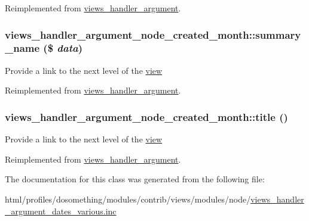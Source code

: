 Reimplemented from \hyperlink{classviews__handler__argument_aad03acefdb44288d7e6c7793bc33f66c}{views\_\-handler\_\-argument}.\hypertarget{classviews__handler__argument__node__created__month_a1376f79ca0408659bea06caa51ce6da6}{
\subsubsection[{summary\_\-name}]{\setlength{\rightskip}{0pt plus 5cm}views\_\-handler\_\-argument\_\-node\_\-created\_\-month::summary\_\-name (\$ {\em data})}}
\label{classviews__handler__argument__node__created__month_a1376f79ca0408659bea06caa51ce6da6}
Provide a link to the next level of the \hyperlink{classview}{view} 

Reimplemented from \hyperlink{classviews__handler__argument_a4c55a340453eed4d35c69f7ac790cac1}{views\_\-handler\_\-argument}.\hypertarget{classviews__handler__argument__node__created__month_a3dbf8aaf46f210de7c29c36abfb7a2d6}{
\subsubsection[{title}]{\setlength{\rightskip}{0pt plus 5cm}views\_\-handler\_\-argument\_\-node\_\-created\_\-month::title ()}}
\label{classviews__handler__argument__node__created__month_a3dbf8aaf46f210de7c29c36abfb7a2d6}
Provide a link to the next level of the \hyperlink{classview}{view} 

Reimplemented from \hyperlink{classviews__handler__argument_a76181ac24e7be4a09aaafc1fa5f15ea1}{views\_\-handler\_\-argument}.

The documentation for this class was generated from the following file:\begin{DoxyCompactItemize}
\item 
html/profiles/dosomething/modules/contrib/views/modules/node/\hyperlink{views__handler__argument__dates__various_8inc}{views\_\-handler\_\-argument\_\-dates\_\-various.inc}\end{DoxyCompactItemize}
